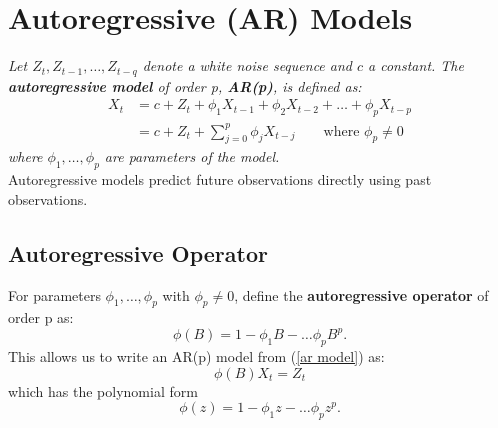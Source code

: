 \documentclass{article}
\begin{document}
\section{Autoregressive (AR) Models}
\textit{Let $Z_t, Z_{t-1}, \ldots, Z_{t-q}$ denote a white noise sequence and $c$ a constant. The \textbf{autoregressive model} of order p, \textbf{AR(p)}, is defined as:
\begin{align}\label{ar model}
    X_t &= c + Z_t + \phi_1 X_{t-1} + \phi_2 X_{t-2} + \ldots + \phi_p X_{t-p}\nonumber\\
    &= c + Z_t + \sum_{j=0}^p \phi_j X_{t-j} \qquad \text{where } \phi_p \neq 0
\end{align}
where $\phi_1, \ldots, \phi_p$ are parameters of the model.\\
}
Autoregressive models predict future observations directly using past observations.
\subsection{Autoregressive Operator}
For parameters $\phi_1, \ldots, \phi_p$ with $\phi_p \neq 0$, define the \textbf{autoregressive operator} of order p as:
\begin{equation}\label{ar operator}
    \phi(B)=1-\phi_1B-\ldots \phi_p B^p.
\end{equation}
This allows us to write an AR(p) model from (\ref{ar model}) as:
\begin{equation}
    \phi(B)X_t = Z_t
\end{equation}
which has the polynomial form
\begin{equation}\label{ar poly}
    \phi(z)=1-\phi_1z-\ldots \phi_p z^p.
\end{equation}
\end{document}
